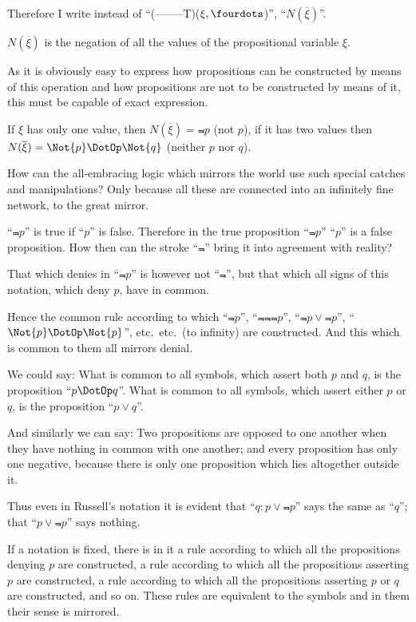{Therefore I write instead of \mbox{``(--\;--\;--\;--\;--T)}\AllowBreak($\xi, \fourdots$)'',
``$N(\overline{\xi})$''.

$N(\overline{\xi})$ is the negation of all the values of the
propositional variable $\xi$.}


{As it is obviously easy to express how propositions
can be constructed by means of this operation
and how propositions are not to be constructed by
means of it, this must be capable of exact expression.}


{If $\xi$ has only one value, then $N(\overline{\xi}) = \Not{p}$ (not $p$),
if it has two values then $N(\overline{\xi}) = \Not{p} \DotOp \Not{q}$ (neither
$p$ nor $q$).}


{How can the all-embracing logic which mirrors
the world use such special catches and manipulations?
Only because all these are connected into
an infinitely fine network, to the great mirror.}


{``$\Not{p}$'' is true if ``$p$'' is false. Therefore in the
true proposition ``$\Not{p}$'' ``$p$'' is a false proposition.
How then can the stroke ``$\Not{}$'' bring it into
agreement with reality?

That which denies in ``$\Not{p}$'' is however not
``$\Not{}$'', but that which all signs of this notation,
which deny $p$, have in common.

Hence the common rule according to which
``$\Not{p}$'', ``$\Not{\Not{\Not{p}}}$'', ``${\Not{p}} \lor {\Not{p}}$'', ``$\Not{p} \DotOp \Not{p}$'',
etc.\ etc.\ (to infinity) are constructed. And this
which is common to them all mirrors denial.}


{We could say: What is common to all symbols,
which assert both $p$ and $q$, is the proposition
``$p \DotOp q$''. What is common to all symbols, which
assert either $p$ or $q$, is the proposition ``$p \lor q$''.

And similarly we can say: Two propositions
are opposed to one another when they have
nothing in common with one another; and every
proposition has only one negative, because there
is only one proposition which lies altogether
outside it.

Thus even in Russell's notation it is evident
that ``${q : p} \lor {\Not{p}}$'' says the same as ``$q$''; that
``$p \lor {\Not{p}}$'' says nothing.}


{If a notation is fixed, there is in it a rule according
to which all the propositions denying $p$ are
constructed, a rule according to which all the
propositions asserting $p$ are constructed, a rule
according to which all the propositions asserting
$p$ or $q$ are constructed, and so on. These rules
are equivalent to the symbols and in them their
sense is mirrored.}



